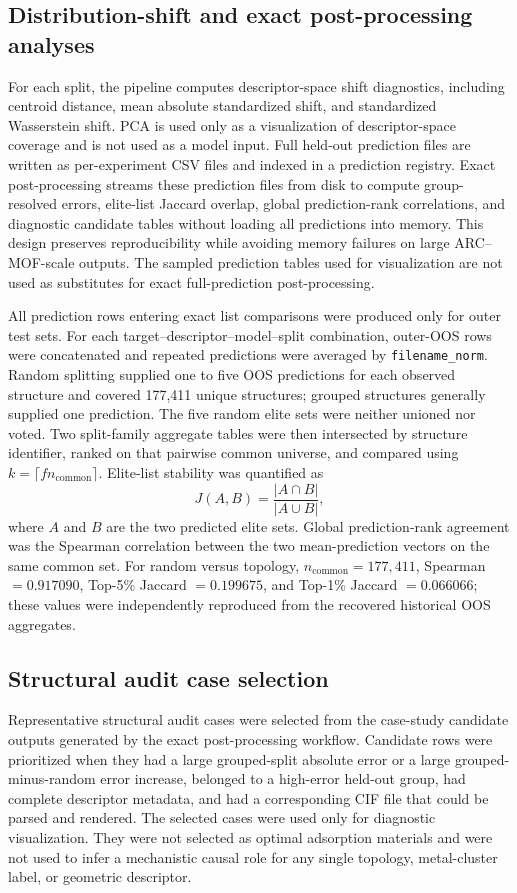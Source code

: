 \documentclass[11pt,a4paper]{article}
\begin{document}
\subsection*{Distribution-shift and exact post-processing analyses}
For each split, the pipeline computes descriptor-space shift diagnostics, including centroid distance, mean absolute standardized shift, and standardized Wasserstein shift. PCA is used only as a visualization of descriptor-space coverage and is not used as a model input. Full held-out prediction files are written as per-experiment CSV files and indexed in a prediction registry. Exact post-processing streams these prediction files from disk to compute group-resolved errors, elite-list Jaccard overlap, global prediction-rank correlations, and diagnostic candidate tables without loading all predictions into memory. This design preserves reproducibility while avoiding memory failures on large ARC--MOF-scale outputs. The sampled prediction tables used for visualization are not used as substitutes for exact full-prediction post-processing.


All prediction rows entering exact list comparisons were produced only for outer test sets. For each target--descriptor--model--split combination, outer-OOS rows were concatenated and repeated predictions were averaged by \texttt{filename\_norm}. Random splitting supplied one to five OOS predictions for each observed structure and covered 177,411 unique structures; grouped structures generally supplied one prediction. The five random elite sets were neither unioned nor voted. Two split-family aggregate tables were then intersected by structure identifier, ranked on that pairwise common universe, and compared using $k=\lceil f n_{\mathrm{common}}\rceil$. Elite-list stability was quantified as
\[
J(A,B)=\frac{|A\cap B|}{|A\cup B|},
\]
where $A$ and $B$ are the two predicted elite sets. Global prediction-rank agreement was the Spearman correlation between the two mean-prediction vectors on the same common set. For random versus topology, $n_{\mathrm{common}}=177{,}411$, Spearman $=0.917090$, Top-5\% Jaccard $=0.199675$, and Top-1\% Jaccard $=0.066066$; these values were independently reproduced from the recovered historical OOS aggregates.

\subsection*{Structural audit case selection}
Representative structural audit cases were selected from the case-study candidate outputs generated by the exact post-processing workflow. Candidate rows were prioritized when they had a large grouped-split absolute error or a large grouped-minus-random error increase, belonged to a high-error held-out group, had complete descriptor metadata, and had a corresponding CIF file that could be parsed and rendered. The selected cases were used only for diagnostic visualization. They were not selected as optimal adsorption materials and were not used to infer a mechanistic causal role for any single topology, metal-cluster label, or geometric descriptor.
\end{document}
